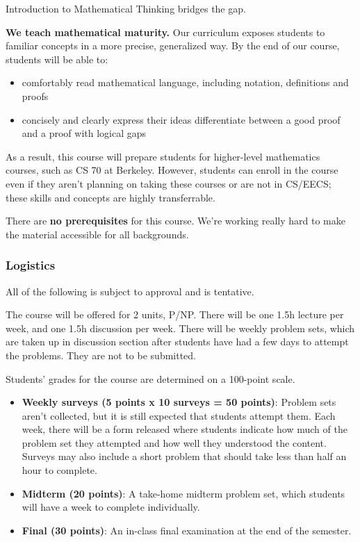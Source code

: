 \documentclass[]{article}
\providecommand{\tightlist}{%
  \setlength{\itemsep}{0pt}\setlength{\parskip}{0pt}}
\begin{document}
Introduction to Mathematical Thinking bridges the gap.

\textbf{We teach mathematical maturity.} Our curriculum exposes students
to familiar concepts in a more precise, generalized way. By the end of
our course, students will be able to:

\begin{itemize}
\tightlist
\item
  comfortably read mathematical language, including notation,
  definitions and proofs
\item
  concisely and clearly express their ideas differentiate between a good
  proof and a proof with logical gaps
\end{itemize}

As a result, this course will prepare students for higher-level
mathematics courses, such as CS 70 at Berkeley. However, students can
enroll in the course even if they aren't planning on taking these
courses or are not in CS/EECS; these skills and concepts are highly
transferrable.

There are \textbf{no prerequisites} for this course. We're working
really hard to make the material accessible for all backgrounds.

\hypertarget{logistics}{%
\subsubsection{Logistics}\label{logistics}}

All of the following is subject to approval and is tentative.

The course will be offered for 2 units, P/NP. There will be one 1.5h
lecture per week, and one 1.5h discussion per week. There will be weekly
problem sets, which are taken up in discussion section after students
have had a few days to attempt the problems. They are not to be
submitted.

Students' grades for the course are determined on a 100-point scale.

\begin{itemize}
\tightlist
\item
  \textbf{Weekly surveys (5 points x 10 surveys = 50 points)}: Problem
  sets aren't collected, but it is still expected that students attempt
  them. Each week, there will be a form released where students indicate
  how much of the problem set they attempted and how well they
  understood the content. Surveys may also include a short problem that
  should take less than half an hour to complete.
\item
  \textbf{Midterm (20 points)}: A take-home midterm problem set, which
  students will have a week to complete individually.
\item
  \textbf{Final (30 points)}: An in-class final examination at the end
  of the semester.
\end{itemize}
\end{document}
